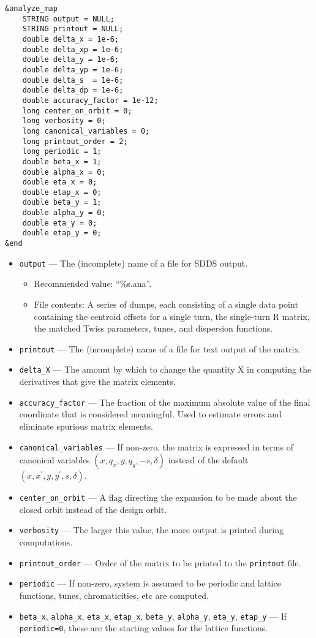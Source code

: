 \documentclass[11pt]{article}
\begin{document}
\begin{verbatim}
&analyze_map
    STRING output = NULL;
    STRING printout = NULL;
    double delta_x = 1e-6;
    double delta_xp = 1e-6;
    double delta_y = 1e-6;
    double delta_yp = 1e-6;
    double delta_s  = 1e-6;
    double delta_dp = 1e-6;
    double accuracy_factor = 1e-12;
    long center_on_orbit = 0;
    long verbosity = 0;
    long canonical_variables = 0;
    long printout_order = 2;
    long periodic = 1;
    double beta_x = 1;
    double alpha_x = 0;
    double eta_x = 0;
    double etap_x = 0;
    double beta_y = 1;
    double alpha_y = 0;
    double eta_y = 0;
    double etap_y = 0;
&end
\end{verbatim}

\begin{itemize}
\item \verb|output| --- The (incomplete) name of a file for SDDS output.
    \begin{itemize}
    \item Recommended value: ``\%s.ana''.
    \item File contents:  A series of dumps, each consisting of a single data point containing
        the centroid offsets for a single turn, the single-turn R matrix, the matched Twiss parameters, tunes, and 
        dispersion functions.
    \end{itemize}
\item \verb|printout| --- The (incomplete) name of a file for text output of the matrix.
\item \verb|delta_X| --- The amount by which to change the quantity X in computing the derivatives that give the matrix elements.
\item \verb|accuracy_factor| --- The fraction of the maximum absolute value of the final coordinate that is considered meaningful.
  Used to estimate errors and eliminate spurious matrix elements.
\item \verb|canonical_variables| --- If non-zero, the matrix is expressed in terms of canonical variables $(x, q_x, y, q_y, -s, \delta)$
  instead of the default $(x, x^\prime, y, y^\prime, s, \delta)$.
\item \verb|center_on_orbit| --- A flag directing the expansion to be made about the closed orbit instead of the design orbit.
\item \verb|verbosity| --- The larger this value, the more output is printed during computations.
\item \verb|printout_order| --- Order of the matrix to be printed to the \verb|printout| file.
\item \verb|periodic| --- If non-zero, system is assumed to be periodic and lattice functions, tunes, chromaticities, etc are computed.
\item \verb|beta_x|, \verb|alpha_x|, \verb|eta_x|, \verb|etap_x|, \verb|beta_y|, \verb|alpha_y|, \verb|eta_y|, \verb|etap_y| ---
  If \verb|periodic=0|, these are the starting values for the lattice functions.
\end{itemize}
\end{document}
